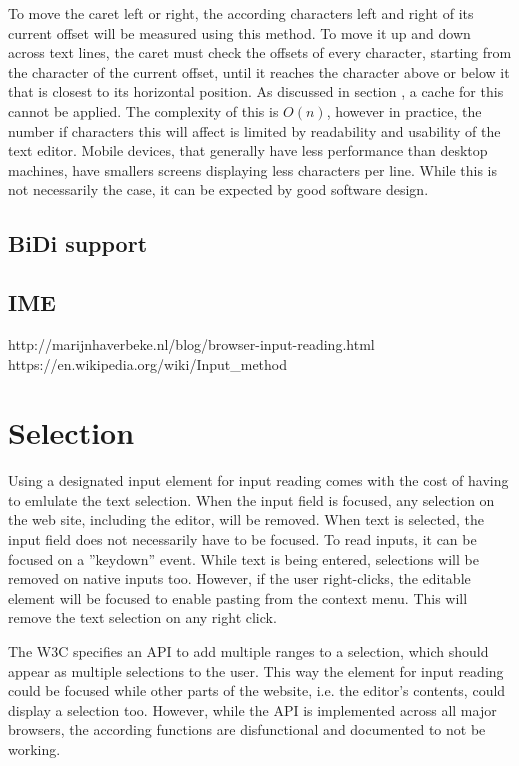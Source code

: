 To move the caret left or right, the according characters left and right of its current offset will be measured using this method. To move it up and down across text lines, the caret must check the offsets of every character, starting from the character of the current offset, until it reaches the character above or below it that is closest to its horizontal position. As discussed in section , a cache for this cannot be applied. The complexity of this is $O(n)$, however in practice, the number if characters this will affect is limited by readability and usability of the text editor. Mobile devices, that generally have less performance than desktop machines, have smallers screens displaying less characters per line. While this is not necessarily the case, it can be expected by good software design.



\subsection{BiDi support}
\subsection{IME} 
http://marijnhaverbeke.nl/blog/browser-input-reading.html 
https://en.wikipedia.org/wiki/Input\_method


\section{Selection}

Using a designated input element for input reading comes with the cost of having to emlulate the text selection. When the input field is focused, any selection on the web site, including the editor, will be removed. When text is selected, the input field does not necessarily have to be focused. To read inputs, it can be focused on a ''keydown'' event. While text is being entered, selections will be removed on native inputs too. However, if the user right-clicks, the editable  element will be focused to enable pasting from the context menu. This will remove the text selection on any right click.

The W3C specifies an API to add multiple ranges to a selection, which should appear as multiple selections to the user. This way the element for input reading could be focused while other parts of the website, i.e. the editor's contents, could display a selection too. However, while the API is implemented across all major browsers, the according functions are disfunctional and documented to not be working.

